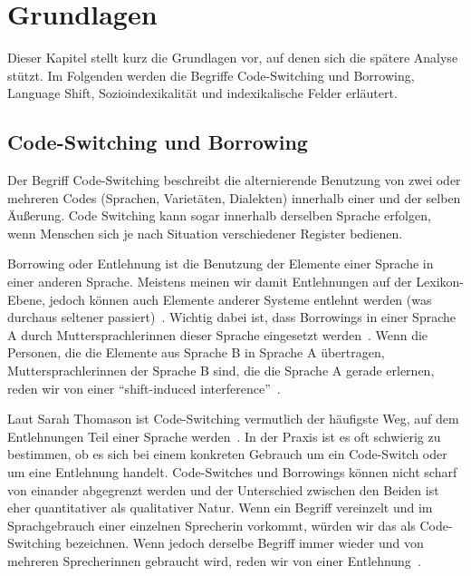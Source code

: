 \section{Grundlagen}

\begin{comment}
Begriffe:
* code switching
(* borrowings)
* language shift
* Sozioindexikalität
* Indexical field?
* Medientheorie?
\end{comment}


Dieser Kapitel stellt kurz die Grundlagen vor, auf denen sich die spätere Analyse stützt.
Im Folgenden werden die Begriffe Code-Switching und Borrowing, Language Shift, %
Sozioindexikalität und indexikalische Felder erläutert.

\subsection{Code-Switching und Borrowing}
Der Begriff Code-Switching beschreibt die alternierende Benutzung von zwei oder mehreren Codes (Sprachen, Varietäten, Dialekten) innerhalb einer und der selben Äußerung. %
Code Switching kann sogar innerhalb derselben Sprache erfolgen, wenn Menschen sich je nach Situation verschiedener Register bedienen.

Borrowing oder Entlehnung ist die Benutzung der Elemente einer Sprache in einer anderen Sprache.
Meistens meinen wir damit Entlehnungen auf der Lexikon-Ebene, jedoch können auch Elemente anderer Systeme entlehnt werden (was durchaus seltener passiert)~\cite{Thomason03}.%
Wichtig dabei ist, dass Borrowings in einer Sprache A durch Muttersprachlerinnen dieser Sprache eingesetzt werden~\cite{Thomason03}. %
Wenn die Personen, die die Elemente aus Sprache B in Sprache A übertragen, Muttersprachlerinnen der Sprache B sind, die die Sprache A gerade erlernen, reden wir von einer ``shift-induced interference''~\cite{Thomason03}. %


Laut Sarah Thomason ist Code-Switching vermutlich der häufigste Weg, auf dem Entlehnungen Teil einer Sprache werden~\cite{Thomason03}. %
In der Praxis ist es oft schwierig zu bestimmen, ob es sich bei einem konkreten Gebrauch um ein Code-Switch oder um eine Entlehnung handelt.
Code-Switches und Borrowings können nicht scharf von einander abgegrenzt werden und der Unterschied zwischen den Beiden ist eher quantitativer als qualitativer Natur.
Wenn ein Begriff vereinzelt und im Sprachgebrauch einer einzelnen Sprecherin vorkommt, würden wir das als Code-Switching bezeichnen.
Wenn jedoch derselbe Begriff immer wieder und von mehreren Sprecherinnen gebraucht wird, reden wir von einer Entlehnung~\cite{Thomason03}. %

